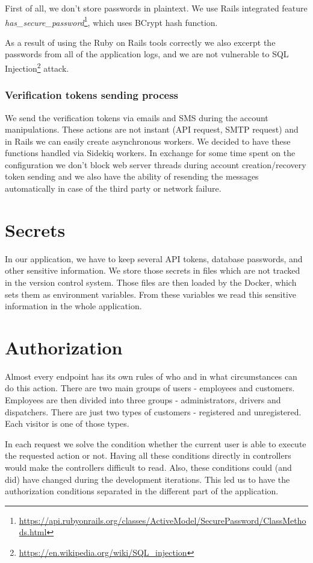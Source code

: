 	First of all, we don't store passwords in plaintext. We use Rails integrated feature \textit{has\_secure\_password}\footnote{\url{https://api.rubyonrails.org/classes/ActiveModel/SecurePassword/ClassMethods.html}}, which uses BCrypt hash function.
	
	As a result of using the Ruby on Rails tools correctly we also excerpt the passwords from all of the application logs, and we are not vulnerable to SQL Injection\footnote{\url{https://en.wikipedia.org/wiki/SQL\_injection}} attack.

\subsubsection{Verification tokens sending process}
	We send the verification tokens via emails and SMS during the account manipulations. These actions are not instant (API request, SMTP request) and in Rails we can easily create asynchronous workers. We decided to have these functions handled via Sidekiq workers. In exchange for some time spent on the configuration we don't block web server threads during account creation/recovery token sending and we also have the ability of resending the messages automatically in case of the third party or network failure.

\section{Secrets}
	In our application, we have to keep several API tokens, database passwords, and other sensitive information. We store those secrets in files which are not tracked in the version control system. Those files are then loaded by the Docker, which sets them as environment variables. From these variables we read this sensitive information in the whole application.  

\section{Authorization}
Almost every endpoint has its own rules of who and in what circumstances can do this action. There are two main groups of users - employees and customers. Employees are then divided into three groups - administrators, drivers and dispatchers. There are just two types of customers - registered and unregistered. Each visitor is one of those types.

In each request we solve the condition whether the current user is able to execute the requested action or not. Having all these conditions directly in controllers would make the controllers difficult to read. Also, these conditions could (and did) have changed during the development iterations. This led us to have the authorization conditions separated in the different part of the application.

